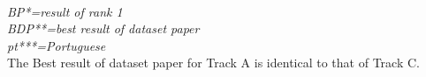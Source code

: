 \begin{table*}[h]
{\begin{tabular}{l|c|cccc|ccccc|ccccc}
            \hline
        \end{tabular}
    }
    \\
    \footnotesize{\textit{BP*=result of rank 1\\BDP**=best result of dataset paper\citep{muhammad2025brighterbridginggaphumanannotated}\\pt***=Portuguese}}
    \\
    \footnotesize{The Best result of dataset paper for Track A is identical to that of Track C.}
\end{table*}
